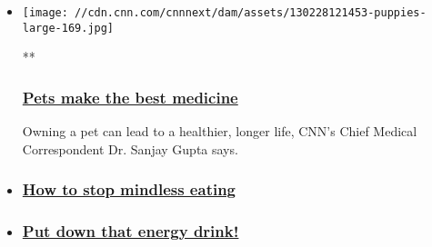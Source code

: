 \begin{itemize}
\item
  \href{/videos/health/2015/04/09/cnn-orig-living-to-100-pets-are-best-medicine.cnn}{}

  \texttt{[image: //cdn.cnn.com/cnnnext/dam/assets/130228121453-puppies-large-169.jpg]}

  **

  \hypertarget{pets-make-the-best-medicine}{%
  \subsubsection{\texorpdfstring{\href{/videos/health/2015/04/09/cnn-orig-living-to-100-pets-are-best-medicine.cnn}{Pets
  make the best
  medicine}}{Pets make the best medicine}}\label{pets-make-the-best-medicine}}

  Owning a pet can lead to a healthier, longer life, CNN's Chief Medical
  Correspondent Dr. Sanjay Gupta says.
\item
  \hypertarget{how-to-stop-mindless-eating}{%
  \subsubsection{\texorpdfstring{\href{/videos/health/2015/04/09/cnn-orig-living-to-100-stop-mindless-eating.cnn}{How
  to stop mindless
  eating}}{How to stop mindless eating}}\label{how-to-stop-mindless-eating}}
\item
  \hypertarget{put-down-that-energy-drink}{%
  \subsubsection{\texorpdfstring{\href{/videos/health/2015/04/09/cnn-orig-living-to-100-energy-drinks.cnn}{Put
  down that energy
  drink!}}{Put down that energy drink!}}\label{put-down-that-energy-drink}}
\end{itemize}

